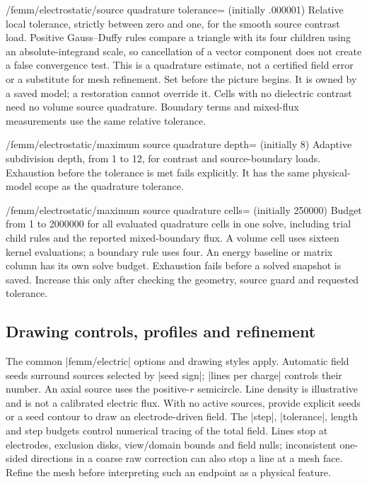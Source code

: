 \begin{key}{/femm/electrostatic/source quadrature tolerance= (initially .000001)}
Relative local tolerance, strictly between zero and one, for the smooth source
contrast load. Positive Gauss--Duffy rules compare a triangle with its four
children using an absolute-integrand scale, so cancellation of a vector
component does not create a false convergence test. This is a quadrature
estimate, not a certified field error or a substitute for mesh refinement.
Set before the picture begins. It is owned by a saved model; a restoration
cannot override it. Cells with no dielectric contrast need no volume source quadrature.
Boundary terms and mixed-flux measurements use the same relative tolerance.
\end{key}
\begin{key}{/femm/electrostatic/maximum source quadrature depth= (initially 8)}
Adaptive subdivision depth, from 1 to 12, for contrast and source-boundary loads. Exhaustion
before the tolerance is met fails explicitly. It has the same physical-model
scope as the quadrature tolerance.
\end{key}
\begin{key}{/femm/electrostatic/maximum source quadrature cells= (initially 250000)}
Budget from 1 to 2000000 for all evaluated quadrature cells in one solve,
including trial child rules and the reported mixed-boundary flux. A volume
cell uses sixteen kernel evaluations; a boundary rule uses four. An energy
baseline or matrix column has its own solve budget.
Exhaustion fails before a solved snapshot is saved. Increase this only after
checking the geometry, source guard and requested tolerance.
\end{key}

\subsection{Drawing controls, profiles and refinement}
\label{sec:electric-source-views}
The common |femm/electric| options and drawing styles apply. Automatic field
seeds surround sources selected by |seed sign|; |lines per charge| controls
their number. An axial source uses the positive-$r$ semicircle. Line density
is illustrative and is not a calibrated electric flux. With no active sources,
provide explicit seeds or a seed contour to draw an electrode-driven field.
The |step|, |tolerance|, length and step budgets control numerical tracing of
the total field. Lines stop at electrodes, exclusion disks, view/domain bounds
and field nulls; inconsistent one-sided directions in a coarse raw correction
can also stop a line at a mesh face. Refine the mesh before interpreting such
an endpoint as a physical feature.

